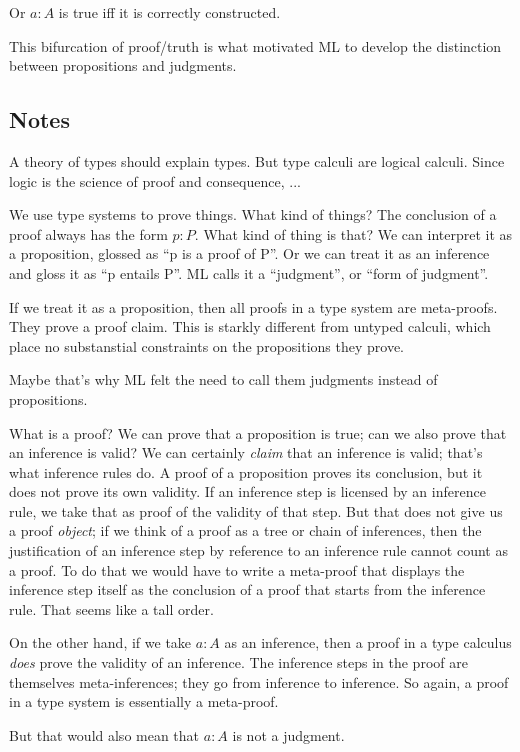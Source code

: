 \documentclass{article}
\begin{document}
Or \(a:A\) is true iff it is correctly constructed.


This bifurcation of proof/truth is what motivated ML to develop the
distinction between propositions and judgments.

\subsection{Notes}
A theory of types should explain types. But type calculi are logical
calculi. Since logic is the science of proof and consequence, ...

We use type systems to prove things. What kind of things? The
conclusion of a proof always has the form \(p:P\). What kind of thing
is that? We can interpret it as a proposition, glossed as ``p is a
proof of P''. Or we can treat it as an inference and gloss it as ``p
entails P''. ML calls it a ``judgment'', or ``form of judgment''.

If we treat it as a proposition, then all proofs in a type system are
meta-proofs. They prove a proof claim. This is starkly different from
untyped calculi, which place no substanstial constraints on the
propositions they prove.

Maybe that's why ML felt the need to call them judgments instead of
propositions.

What is a proof? We can prove that a proposition is true; can we also
prove that an inference is valid? We can certainly \textit{claim} that
an inference is valid; that's what inference rules do. A proof of a
proposition proves its conclusion, but it does not prove its own
validity. If an inference step is licensed by an inference rule, we
take that as proof of the validity of that step. But that does not
give us a proof \textit{object}; if we think of a proof as a tree or
chain of inferences, then the justification of an inference step by
reference to an inference rule cannot count as a proof. To do that we
would have to write a meta-proof that displays the inference step
itself as the conclusion of a proof that starts from the inference
rule.  That seems like a tall order.

On the other hand, if we take \(a:A\) as an inference, then a proof in
a type calculus \textit{does} prove the validity of an inference. The
inference steps in the proof are themselves meta-inferences; they go
from inference to inference. So again, a proof in a type system is
essentially a meta-proof.

But that would also mean that \(a:A\) is not a judgment.
\end{document}
